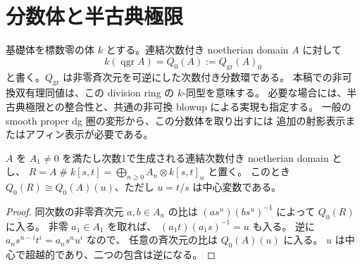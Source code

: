 \section{分数体と半古典極限}
\label{sec:nc-fields}

基礎体を標数零の体 $k$ とする。連結次数付き noetherian domain $A$ に対して
\[
 k(\operatorname{qgr}A)=Q_0(A):=Q_{\mathrm{gr}}(A)_0
\]
と書く。$Q_{\mathrm{gr}}$ は非零斉次元を可逆にした次数付き分数環である。
本稿での非可換双有理同値は、この division ring の $k$-同型を意味する。
必要な場合には、半古典極限との整合性と、共通の非可換 blowup による実現も指定する。
一般の smooth proper dg 圏の変形から、この分数体を取り出すには
追加の射影表示またはアフィン表示が必要である。

\begin{lemma}\label{lem:segre-field}
$A$ を $A_1\ne0$ を満たし次数1で生成される連結次数付き noetherian domain とし、
$R=A\mathbin{\#}k[s,t]=\bigoplus_{n\geq0}A_n\otimes k[s,t]_n$ と置く。
このとき $Q_0(R)\cong Q_0(A)(u)$、ただし $u=t/s$ は中心変数である。
\end{lemma}
\begin{proof}
同次数の非零斉次元 $a,b\in A_n$ の比は
$(a s^n)(b s^n)^{-1}$ によって $Q_0(R)$ に入る。
非零 $a_1\in A_1$ を取れば、
$(a_1t)(a_1s)^{-1}=u$ も入る。
逆に $a_ns^{n-i}t^i=a_ns^n u^i$ なので、
任意の斉次元の比は $Q_0(A)(u)$ に入る。
$u$ は中心で超越的であり、二つの包含は逆になる。
\end{proof}

